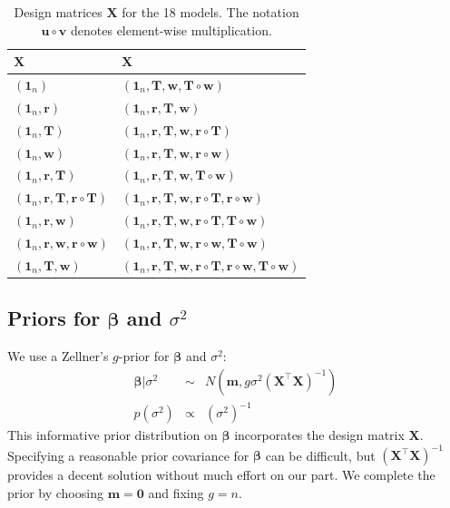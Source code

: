 \documentclass{asaproc}
\newcommand{\m}[1]{\mathbf{\bm{#1}}}
\begin{document}
\begin{table}
\caption{Design matrices $\m{X}$ for the 18 models. The notation $\m{u}\circ\m{v}$ denotes element-wise multiplication.}
\centering
\begin{tabular}{ll}
\\ [-5pt]
\hline \hline
$\m{X}$                                     & $\m{X}$   \\ \hline
$(\m{1}_n)$                                 & $(\m{1}_n, \m{T}, \m{w}, \m{T}\circ \m{w})$ \\
$(\m{1}_n, \m{r})$                          & $(\m{1}_n, \m{r}, \m{T}, \m{w})$ \\
$(\m{1}_n, \m{T})$                          & $(\m{1}_n, \m{r}, \m{T}, \m{w}, \m{r}\circ \m{T})$ \\
$(\m{1}_n, \m{w})$                          & $(\m{1}_n, \m{r}, \m{T}, \m{w}, \m{r}\circ\m{w})$ \\
$(\m{1}_n, \m{r}, \m{T})$                   & $(\m{1}_n, \m{r}, \m{T}, \m{w}, \m{T}\circ \m{w})$ \\
$(\m{1}_n, \m{r}, \m{T}, \m{r}\circ \m{T})$ & $(\m{1}_n, \m{r}, \m{T}, \m{w}, \m{r}\circ \m{T}, \m{r}\circ\m{w})$ \\
$(\m{1}_n, \m{r}, \m{w})$                   & $(\m{1}_n, \m{r}, \m{T}, \m{w}, \m{r}\circ \m{T}, \m{T}\circ\m{w})$ \\
$(\m{1}_n, \m{r}, \m{w}, \m{r}\circ \m{w})$ & $(\m{1}_n, \m{r}, \m{T}, \m{w}, \m{r}\circ \m{w}, \m{T}\circ\m{w})$ \\
$(\m{1}_n, \m{T}, \m{w})$                   & $(\m{1}_n, \m{r}, \m{T}, \m{w}, \m{r}\circ \m{T}, \m{r}\circ\m{w}, \m{T}\circ\m{w})$ \\ \hline\hline
\end{tabular}
\label{models}
\end{table}

\subsection{Priors for $\m{\beta}$ and $\sigma^2$}

We use a Zellner's $g$-prior for $\m{\beta}$ and $\sigma^2$:
\begin{eqnarray*}
\m{\beta}|\sigma^2 &\sim& N\left(\m{m}, g\sigma^2(\m{X}^\top\m{X})^{-1}\right) \\
p(\sigma^2) &\propto& (\sigma^2)^{-1}
\end{eqnarray*}
This informative prior distribution on $\m{\beta}$ incorporates the design matrix $\m{X}$. Specifying a reasonable prior covariance for $\m{\beta}$ can be difficult, but $(\m{X}^\top\m{X})^{-1}$ provides a decent solution without much effort on our part. We complete the prior by choosing $\m{m}=\m{0}$ and fixing $g=n$.
\end{document}
